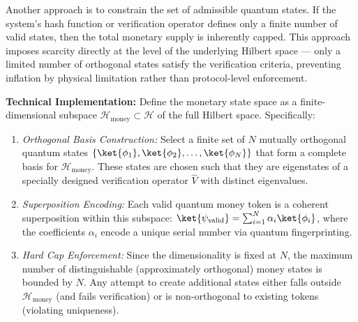 Another approach is to constrain the set of admissible quantum states. If the system's hash function or verification operator defines only a finite number of valid states, then the total monetary supply is inherently capped. This approach imposes scarcity directly at the level of the underlying Hilbert space — only a limited number of orthogonal states satisfy the verification criteria, preventing inflation by physical limitation rather than protocol-level enforcement.

\textbf{Technical Implementation:} Define the monetary state space as a finite-dimensional subspace $\mathcal{H}_{\text{money}} \subset \mathcal{H}$ of the full Hilbert space. Specifically:
\begin{enumerate}
\item \textit{Orthogonal Basis Construction:} Select a finite set of $N$ mutually orthogonal quantum states $\{\ket{\phi_1}, \ket{\phi_2}, \ldots, \ket{\phi_N}\}$ that form a complete basis for $\mathcal{H}_{\text{money}}$. These states are chosen such that they are eigenstates of a specially designed verification operator $\hat{V}$ with distinct eigenvalues.
\item \textit{Superposition Encoding:} Each valid quantum money token is a coherent superposition within this subspace: $\ket{\psi_{\text{valid}}} = \sum_{i=1}^{N} \alpha_i \ket{\phi_i}$, where the coefficients $\alpha_i$ encode a unique serial number via quantum fingerprinting.
\item \textit{Hard Cap Enforcement:} Since the dimensionality is fixed at $N$, the maximum number of distinguishable (approximately orthogonal) money states is bounded by $N$. Any attempt to create additional states either falls outside $\mathcal{H}_{\text{money}}$ (and fails verification) or is non-orthogonal to existing tokens (violating uniqueness).
\end{enumerate}

